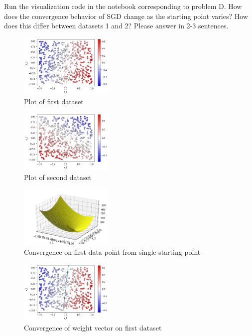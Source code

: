 \newpage

\begin{problem}[2]
  Run the visualization code in the notebook corresponding to problem D. How does the convergence behavior of SGD change as the starting point varies? How does this differ between datasets 1 and 2? Please answer in 2-3 sentences.
\end{problem}
\begin{solution}
  \begin{figure}[H]
    \centering
    \includegraphics[width=0.4\textwidth]{images/3d_1.png}
    \caption{Plot of first dataset}
    \label{fig:3d_1}
  \end{figure}

  \begin{figure}[H]
    \centering
    \includegraphics[width=0.4\textwidth]{images/3d_2.png}
    \caption{Plot of second dataset}
    \label{fig:3d_2}
  \end{figure}

  \begin{figure}[H]
    \centering
    \includegraphics[width=0.4\textwidth]{images/3d_3.png}
    \caption{Convergence on first data point from single starting point}
    \label{fig:3d_3}
  \end{figure}

  \begin{figure}[H]
    \centering
    \includegraphics[width=0.4\textwidth]{images/3d_4.png}
    \caption{Convergence of weight vector on first dataset}
    \label{fig:3d_4}
  \end{figure}


\end{solution}
